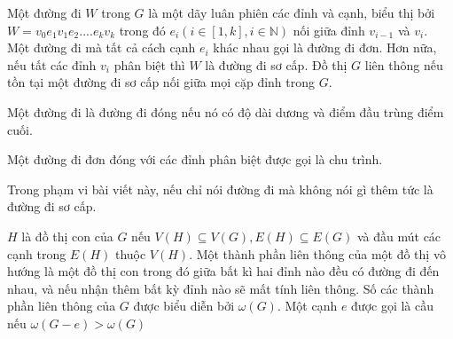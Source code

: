 \begin{definition}
    Một đường đi $W$ trong $G$ là một dãy luân phiên các đỉnh và cạnh, biểu thị bởi $W=v_0e_1v_1e_2....e_kv_k$ trong đó $e_i (i \in [1,k], i \in \mathbb{N})$ nối giữa đỉnh $v_{i-1}$ và $v_i$.
    Một đường đi mà tất cả cách cạnh $e_i$ khác nhau gọi là đường đi đơn.
    Hơn nữa, nếu tất các đỉnh $v_i$ phân biệt thì $W$ là đường đi sơ cấp.
    Đồ thị $G$ liên thông nếu tồn tại một đường đi sơ cấp nối giữa mọi cặp đỉnh trong $G$.

    Một đường đi là đường đi đóng nếu nó có độ dài dương và điểm đầu trùng điểm cuối.

    Một đường đi đơn đóng với các đỉnh phân biệt được gọi là chu trình.
\end{definition}
\begin{remark}
    Trong phạm vi bài viết này, nếu chỉ nói đường đi mà không nói gì thêm tức là đường đi sơ cấp.
\end{remark}
\begin{definition}
    $H$ là đồ thị con của $G$ nếu $V(H) \subseteq V(G), E(H) \subseteq E(G)$ và đầu mút các cạnh trong $E(H)$ thuộc $V(H)$.
    Một thành phần liên thông của một đồ thị vô hướng là một đồ thị con trong đó giữa bất kì hai đỉnh nào đều có đường đi đến nhau, và nếu nhận thêm bất kỳ đỉnh nào sẽ mất tính liên thông.
    Số các thành phần liên thông của $G$ được biểu diễn bởi $\omega(G)$. Một cạnh $e$ được gọi là cầu nếu $\omega(G-e) > \omega(G)$
\end{definition}
\begin{center}
\end{center}

\begin{center}
\end{center}

